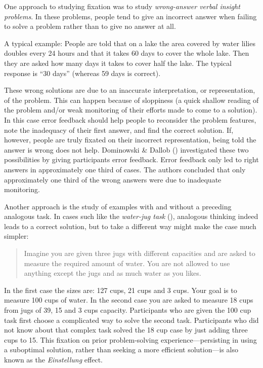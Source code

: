 \documentclass[
]{krantz}
\begin{document}
One approach to studying fixation was to study \emph{wrong-answer verbal insight problems}. In these problems, people tend to give an incorrect answer when failing to solve a problem rather than to give no answer at all.

A typical example: People are told that on a lake the area covered by water lilies doubles every 24 hours and that it takes 60 days to cover the whole lake. Then they are asked how many days it takes to cover half the lake. The typical response is ``30 days'' (whereas 59 days is correct).

These wrong solutions are due to an inaccurate interpretation, or representation, of the problem. This can happen because of sloppiness (a quick shallow reading of the problem and/or weak monitoring of their efforts made to come to a solution). In this case error feedback should help people to reconsider the problem features, note the inadequacy of their first answer, and find the correct solution. If, however, people are truly fixated on their incorrect representation, being told the answer is wrong does not help. Dominowski \& Dallob () investigated these two possibilities by giving participants error feedback. Error feedback only led to right answers in approximately one third of cases. The authors concluded that only approximately one third of the wrong answers were due to inadequate monitoring.

Another approach is the study of examples with and without a preceding analogous task. In cases such like the \emph{water-jug task} (), analogous thinking indeed leads to a correct solution, but to take a different way might make the case much simpler:

\begin{quote}
Imagine you are given three jugs with different capacities and are asked to measure the required amount of water. You are not allowed to use anything except the jugs and as much water as you likes.
\end{quote}

In the first case the sizes are: 127 cups, 21 cups and 3 cups. Your goal is to measure 100 cups of water. In the second case you are asked to measure 18 cups from jugs of 39, 15 and 3 cups capacity. Participants who are given the 100 cup task first choose a complicated way to solve the second task. Participants who did not know about that complex task solved the 18 cup case by just adding three cups to 15. This fixation on prior problem-solving experience---persisting in using a suboptimal solution, rather than seeking a more efficient solution---is also known as the \emph{Einstellung} effect.
\end{document}
